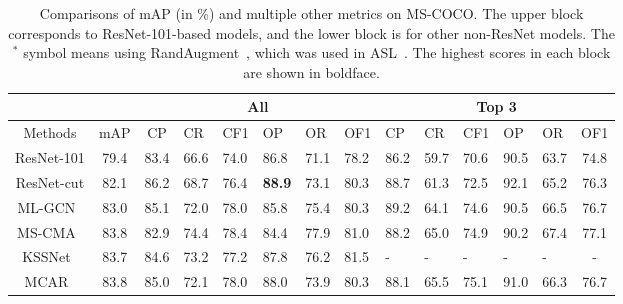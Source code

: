 \documentclass[10pt,twocolumn,letterpaper]{article}
\begin{document}
\begin{table*}
	\caption{Comparisons of mAP (in \%) and multiple other metrics on MS-COCO. The upper block corresponds to ResNet-101-based models, and the lower block is for other non-ResNet models. The $^*$ symbol means using RandAugment~\cite{randaugment}, which was used in ASL~\cite{ASL_2020_arxiv}. The highest scores in each block are shown in boldface.}
	\label{tab:mscoco}
	\centering
	\small
	\begin{tabular}{c|c|clllll | lllllc}
		\hline
		&      & \multicolumn{6}{c|}{All} & \multicolumn{6}{c}{Top 3}                  \\ 
		\hline
		Methods                      & mAP           & CP                       & CR                        & CF1           & OP            & OR            & OF1           & CP            & CR            & CF1           & OP            & OR            & OF1           \\ \hline\hline
		ResNet-101                    & 79.4          & 83.4                     & 66.6                      & 74.0          & 86.8          & 71.1          & 78.2          & 86.2          & 59.7          & 70.6          & 90.5          & 63.7          & 74.8          \\
		ResNet-cut                    & 82.1          & 86.2                     & 68.7                      & 76.4          & \textbf{88.9}  & 73.1          & 80.3          & 88.7          & 61.3          & 72.5          & 92.1          & 65.2          & 76.3          \\
		ML-GCN~\cite{2019_CVPR_GCN}  & 83.0          & 85.1                     & 72.0                      & 78.0          & 85.8          & 75.4          & 80.3          & 89.2          & 64.1          & 74.6          & 90.5          & 66.5          & 76.7          \\
		MS-CMA~\cite{2020_AAAI_CMA}  & 83.8          & 82.9                     & 74.4                      & 78.4          & 84.4          & 77.9          & 81.0          & 88.2          & 65.0          & 74.9          & 90.2          & 67.4          & 77.1          \\
		KSSNet~\cite{2018_ACM_KD}    & 83.7          & 84.6                     & 73.2                      & 77.2          & 87.8          & 76.2          & 81.5          & -             & -             & -             & -             & -             & -             \\
		MCAR~\cite{2020_arxiv_Gaobb} & 83.8          & 85.0                     & 72.1                      & 78.0          & 88.0          & 73.9          & 80.3          & 88.1          & 65.5          & 75.1          & 91.0          & 66.3          & 76.7          \\

\end{tabular}
\end{table*}
\end{document}
